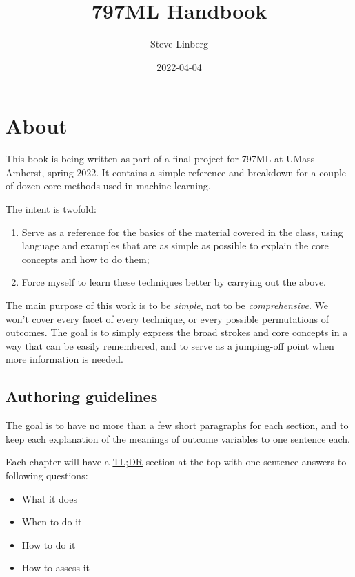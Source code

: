 \documentclass[
]{book}
\title{797ML Handbook}
\author{Steve Linberg}
\date{2022-04-04}
\providecommand{\tightlist}{%
  \setlength{\itemsep}{0pt}\setlength{\parskip}{0pt}}
\begin{document}
\maketitle

{
\setcounter{tocdepth}{1}
\tableofcontents
}
\hypertarget{about}{%
\chapter{About}\label{about}}

This book is being written as part of a final project for 797ML at UMass
Amherst, spring 2022. It contains a simple reference and breakdown for a
couple of dozen core methods used in machine learning.

The intent is twofold:

\begin{enumerate}
\def\labelenumi{\arabic{enumi}.}
\tightlist
\item
  Serve as a reference for the basics of the material covered in the class, using language and examples that are as simple as possible to explain the core concepts and how to do them;
\item
  Force myself to learn these techniques better by carrying out the above.
\end{enumerate}

The main purpose of this work is to be \emph{simple}, not to be \emph{comprehensive}. We won't cover every facet of every technique, or every possible permutations of outcomes. The goal is to simply express the broad strokes and core concepts in a way that can be easily remembered, and to serve as a jumping-off point when more information is needed.

\hypertarget{authoring-guidelines}{%
\section{Authoring guidelines}\label{authoring-guidelines}}

The goal is to have no more than a few short paragraphs for each section, and to keep each explanation of the meanings of outcome variables to one sentence each.

Each chapter will have a \href{https://en.wikipedia.org/wiki/Wikipedia:Too_long;_didn\%27t_read}{TL;DR} section at the top with one-sentence answers to following questions:

\begin{itemize}
\tightlist
\item
  What it does
\item
  When to do it
\item
  How to do it
\item
  How to assess it
\end{itemize}
\end{document}
